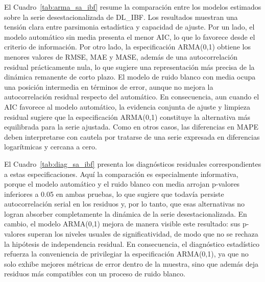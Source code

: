 \documentclass[11pt]{article}
\begin{document}
El Cuadro~\ref{tab:arma_sa_ibf} resume la comparación entre los modelos estimados sobre la serie desestacionalizada de DL\_IBF. Los resultados muestran una tensión clara entre parsimonia estadística y capacidad de ajuste. Por un lado, el modelo automático sin media presenta el menor AIC, lo que lo favorece desde el criterio de información. Por otro lado, la especificación ARMA(0,1) obtiene los menores valores de RMSE, MAE y MASE, además de una autocorrelación residual prácticamente nula, lo que sugiere una representación más precisa de la dinámica remanente de corto plazo. El modelo de ruido blanco con media ocupa una posición intermedia en términos de error, aunque no mejora la autocorrelación residual respecto del automático. En consecuencia, aun cuando el AIC favorece al modelo automático, la evidencia conjunta de ajuste y limpieza residual sugiere que la especificación ARMA(0,1) constituye la alternativa más equilibrada para la serie ajustada. Como en otros casos, las diferencias en MAPE deben interpretarse con cautela por tratarse de una serie expresada en diferencias logarítmicas y cercana a cero.

\begin{table}[H]
\centering
\caption{Comparación de modelos ARMA sobre serie desestacionalizada – DL\_IBF}
\label{tab:arma_sa_ibf}
\end{table}


El Cuadro~\ref{tab:diag_sa_ibf} presenta los diagnósticos residuales correspondientes a estas especificaciones. Aquí la comparación es especialmente informativa, porque el modelo automático y el ruido blanco con media arrojan p-valores inferiores a 0.05 en ambas pruebas, lo que sugiere que todavía persiste autocorrelación serial en los residuos y, por lo tanto, que esas alternativas no logran absorber completamente la dinámica de la serie desestacionalizada. En cambio, el modelo ARMA(0,1) mejora de manera visible este resultado: sus p-valores superan los niveles usuales de significatividad, de modo que no se rechaza la hipótesis de independencia residual. En consecuencia, el diagnóstico estadístico refuerza la conveniencia de privilegiar la especificación ARMA(0,1), ya que no solo exhibe mejores métricas de error dentro de la muestra, sino que además deja residuos más compatibles con un proceso de ruido blanco.
\end{document}
